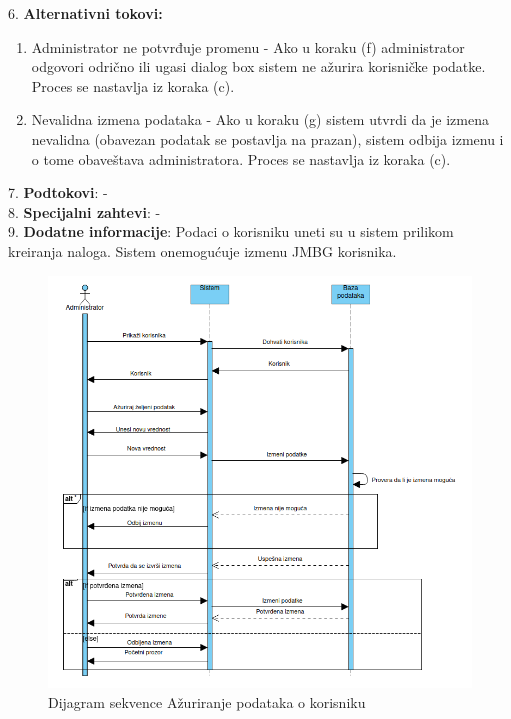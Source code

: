 \documentclass{article}
\begin{document}
6. \textbf{Alternativni tokovi:}
\begin{enumerate} [label=(\roman*)]
    \item Administrator ne potvrđuje promenu - Ako u koraku (f) administrator odgovori odrično ili ugasi dialog box sistem ne ažurira korisničke podatke. Proces se nastavlja iz koraka (c).
    \item Nevalidna izmena podataka - Ako u koraku (g) sistem utvrdi da je izmena nevalidna (obavezan podatak se postavlja na prazan), sistem odbija izmenu i o tome obaveštava administratora. Proces se nastavlja iz koraka (c).
\end{enumerate}

7. \textbf{Podtokovi}: - \\

8. \textbf{Specijalni zahtevi}: - \\

9. \textbf{Dodatne informacije}: Podaci o korisniku uneti su u sistem prilikom kreiranja naloga. Sistem onemogućuje izmenu JMBG korisnika. \\


\begin{figure} [!ht]
    \begin{center}
        \includegraphics[scale=0.4]{imgs/Dijagram_sekvence_administrator_azurira_podatke.png}
    \end{center}
\caption{Dijagram sekvence Ažuriranje podataka o korisniku}
\end{figure}
\end{document}
